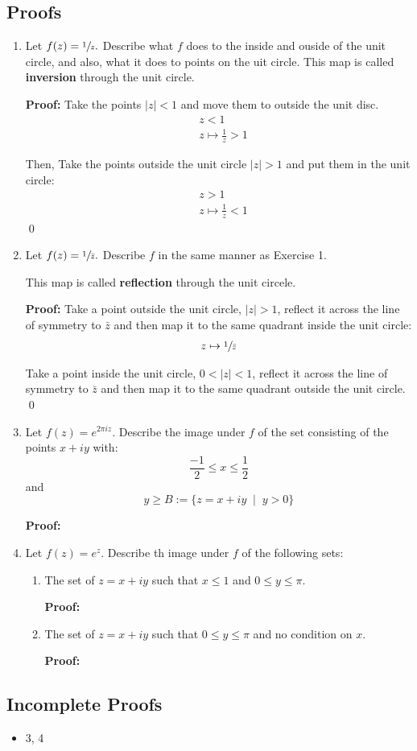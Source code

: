\subsection{Proofs}
\begin{enumerate}
	\item Let $f(z) = \sfrac{1}{z}.$ Describe what $f$ does to the inside and ouside of the unit circle, 
	and also, what it does to points on the uit circle. This map is called \textbf{inversion} through the unit circle.
	
	\textbf{Proof:}
	Take the points $|z| < 1$ and move them to outside the unit disc.
	\begin{align*}
		&z < 1 \\
		&z \mapsto \frac{1}{z} > 1
	\end{align*}

	Then, Take the points outside the unit circle $|z| > 1$ and put them in the unit circle:
	\begin{align*}
		&z > 1 \\
		&z \mapsto \frac{1}{z} < 1
	\end{align*}
	\qed


	\item Let $f(z) = \sfrac{1}{\bar{z}}.$ Describe $f$ in the same manner as Exercise 1. 

	This map is called \textbf{reflection} through the unit circele.
	
	\textbf{Proof:}
	Take a point outside the unit circle, $|z| > 1$, reflect it across the line of symmetry to $\bar{z}$ and 
	then map it to the same quadrant inside the unit circle:
	\begin{align*}
		z \mapsto \sfrac{1}{\bar{z}} \\
	\end{align*}

	Take a point inside the unit circle, $0 < |z| < 1$, reflect it across the line of symmetry to $\bar{z}$ and 
	then map it to the same quadrant outside the unit circle. 
	\qed


	\item Let $f(z) = e^{2\pi iz}.$ Describe the image under $f$ of the set consisting of the points $x + iy$ with:
	\[ \frac{-1}{2} \leq x \leq \frac{1}{2} \]
	and
	\[ y \geq B := \{ z = x + iy \;\;|\;\; y > 0 \} \]

	\textbf{Proof:}

	\item Let $f(z) = e^z.$ Describe th image under $f$ of the following sets:
	
	\begin{enumerate}
		\item The set of $z = x + iy$ such that $x \leq 1$ and $0 \leq y \leq \pi.$
		
		\textbf{Proof:}

		\item The set of $z = x + iy$ such that $0 \leq y \leq \pi$ and no condition on $x.$
		
		\textbf{Proof:}

	\end{enumerate}
	
\end{enumerate}

\subsection{Incomplete Proofs}
\begin{itemize}
	\item 3, 4
\end{itemize}
